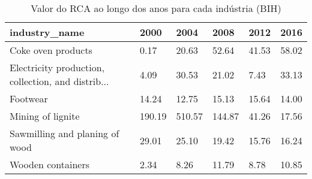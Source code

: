 \begin{table}
\centering
\caption{Valor do RCA ao longo dos anos para cada indústria (BIH)}
\begin{tabular}{p{6cm}p{1.5cm}p{1.5cm}p{1.5cm}p{1.5cm}p{1.5cm}}
\toprule
                                     industry\_name &   2000 &   2004 &   2008 &  2012 &  2016 \\
\midrule
                                Coke oven products &   0.17 &  20.63 &  52.64 & 41.53 & 58.02 \\
Electricity production, collection, and distrib... &   4.09 &  30.53 &  21.02 &  7.43 & 33.13 \\
                                          Footwear &  14.24 &  12.75 &  15.13 & 15.64 & 14.00 \\
                                 Mining of lignite & 190.19 & 510.57 & 144.87 & 41.26 & 17.56 \\
                    Sawmilling and planing of wood &  29.01 &  25.10 &  19.42 & 15.76 & 16.24 \\
                                 Wooden containers &   2.34 &   8.26 &  11.79 &  8.78 & 10.85 \\
\bottomrule
\end{tabular}
\end{table}
